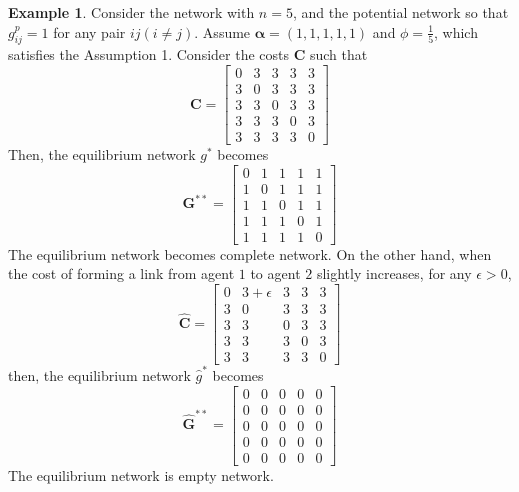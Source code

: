 \documentclass[12pt]{article}
\theoremstyle{definition}
\newtheorem{example}{Example}
\newcommand{\bm}[1]{\boldsymbol{#1}}
\begin{document}
\begin{example}
Consider the network with $n = 5$, and the potential network so that $g_{ij}^p = 1$ for any pair $ij(i \neq j)$.
Assume $\bm{\alpha} = (1, 1, 1, 1, 1)$ and $\phi = \frac{1}{5}$, which satisfies the Assumption 1.
Consider the costs $\bm{C}$ such that
\[ \bm{C} = \left[
			\begin{array}{ccccc}
				0 & 3 & 3 & 3 & 3 \\
				3 & 0 & 3 & 3 & 3 \\
				3 & 3 & 0 & 3 & 3 \\
				3 & 3 & 3 & 0 & 3  \\
				3 & 3 & 3 & 3 & 0
			\end{array} \right] \]
Then, the equilibrium network $g^*$ becomes
\[\bm{G}^{**} = \left[
			\begin{array}{ccccc}
				0 & 1 & 1 & 1 & 1 \\
				1 & 0 & 1 & 1 & 1 \\
				1 & 1 & 0 & 1 & 1 \\
				1 & 1 & 1 & 0 & 1 \\
				1 & 1 & 1 & 1 & 0
			\end{array} \right] \]
The equilibrium network becomes complete network.
On the other hand, when the cost of forming a link from agent $1$ to agent $2$ slightly increases, for any $\epsilon > 0$,
\[ \bm{\hat{C}} = \left[
			\begin{array}{ccccc}
				0 & 3 + \epsilon & 3 & 3 & 3 \\
				3 & 0 & 3 & 3 & 3 \\
				3 & 3 & 0 & 3 & 3 \\
				3 & 3 & 3 & 0 & 3  \\
				3 & 3 & 3 & 3 & 0
			\end{array} \right] \]
then, the equilibrium network $\hat{g}^*$ becomes
\[ \bm{\hat{G}}^{**} = \left[
			\begin{array}{ccccc}
				0 & 0 & 0 & 0 & 0 \\
				0 & 0 & 0 & 0 & 0 \\
				0 & 0 & 0 & 0 & 0 \\
				0 & 0 & 0 & 0 & 0 \\
				0 & 0 & 0 & 0 & 0
			\end{array} \right] \]
The equilibrium network is empty network.
\end{example}
\end{document}
